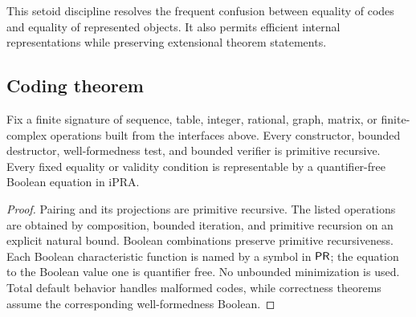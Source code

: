 This setoid discipline resolves the frequent confusion between equality of
codes and equality of represented objects.  It also permits efficient internal
representations while preserving extensional theorem statements.

\subsection{Coding theorem}

\begin{theorem}
Fix a finite signature of sequence, table, integer, rational, graph, matrix, or
finite-complex operations built from the interfaces above.  Every constructor,
bounded destructor, well-formedness test, and bounded verifier is primitive
recursive.  Every fixed equality or validity condition is representable by a
quantifier-free Boolean equation in iPRA.
\end{theorem}

\begin{proof}
Pairing and its projections are primitive recursive.  The listed operations
are obtained by composition, bounded iteration, and primitive recursion on an
explicit natural bound.  Boolean combinations preserve primitive
recursiveness.  Each Boolean characteristic function is named by a symbol in
\(\mathsf{PR}\); the equation to the Boolean value one is quantifier free.  No
unbounded minimization is used.  Total default behavior handles malformed
codes, while correctness theorems assume the corresponding well-formedness
Boolean.
\end{proof}
